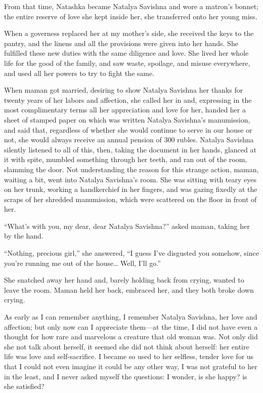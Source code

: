 From that time, Natashka became Natalya Savishna and wore a matron's bonnet; the entire reserve of love she kept inside her, she transferred onto her young miss.

When a governess replaced her at my mother's side, she received the keys to the pantry, and the linens and all the provisions were given into her hands. She fulfilled these new duties with the same diligence and love. She lived her whole life for the good of the family, and saw waste, spoilage, and misuse everywhere, and used all her powers to try to fight the same.

When maman got married, desiring to show Natalya Savishna her thanks for twenty years of her labors and affection, she called her in and, expressing in the most complimentary terms all her appreciation and love for her, handed her a sheet of stamped paper on which was written Natalya Savishna's manumission, and said that, regardless of whether she would continue to serve in our house or not, she would always receive an annual pension of 300 rubles. Natalya Savishna silently listened to all of this, then, taking the document in her hands, glanced at it with spite, mumbled something through her teeth, and ran out of the room, slamming the door. Not understanding the reason for this strange action, maman, waiting a bit, went into Natalya Savishna's room. She was sitting with teary eyes on her trunk, working a handkerchief in her fingers, and was gazing fixedly at the scraps of her shredded manumission, which were scattered on the floor in front of her.

``What's with you, my dear, dear Natalya Savishna?'' asked maman, taking her by the hand. %

``Nothing, precious girl,'' she answered, ``I guess I've disgusted you somehow, since you're running me out of the house\ldots{} Well, I'll go.'' %

She snatched away her hand and, barely holding back from crying, wanted to leave the room. Maman held her back, embraced her, and they both broke down crying.

As early as I can remember anything, I remember Natalya Savishna, her love and affection; but only now can I appreciate them---at the time, I did not have even a thought for how rare and marvelous a creature that old woman was. Not only did she not talk about herself, it seemed she did not think about herself: her entire life was love and self-sacrifice. I became so used to her selfless, tender love for us that I could not even imagine it could be any other way, I was not grateful to her in the least, and I never asked myself the questions: I wonder, is she happy? is she satisfied?

